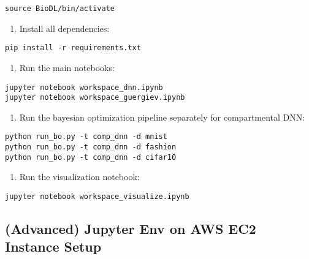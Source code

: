 \begin{verbatim}
source BioDL/bin/activate
\end{verbatim}

\begin{enumerate}
\def\labelenumi{\arabic{enumi}.}
\setcounter{enumi}{2}
\tightlist
\item
  Install all dependencies:
\end{enumerate}

\begin{verbatim}
pip install -r requirements.txt
\end{verbatim}

\begin{enumerate}
\def\labelenumi{\arabic{enumi}.}
\setcounter{enumi}{3}
\tightlist
\item
  Run the main notebooks:
\end{enumerate}

\begin{verbatim}
jupyter notebook workspace_dnn.ipynb
jupyter notebook workspace_guergiev.ipynb
\end{verbatim}

\begin{enumerate}
\def\labelenumi{\arabic{enumi}.}
\setcounter{enumi}{4}
\tightlist
\item
  Run the bayesian optimization pipeline separately for compartmental
  DNN:
\end{enumerate}

\begin{verbatim}
python run_bo.py -t comp_dnn -d mnist
python run_bo.py -t comp_dnn -d fashion
python run_bo.py -t comp_dnn -d cifar10
\end{verbatim}

\begin{enumerate}
\def\labelenumi{\arabic{enumi}.}
\setcounter{enumi}{5}
\tightlist
\item
  Run the visualization notebook:
\end{enumerate}

\begin{verbatim}
jupyter notebook workspace_visualize.ipynb
\end{verbatim}

\hypertarget{advanced-jupyter-env-on-aws-ec2-instance-setup}{%
\subsection*{(Advanced) Jupyter Env on AWS EC2 Instance
Setup}\label{advanced-jupyter-env-on-aws-ec2-instance-setup}}

